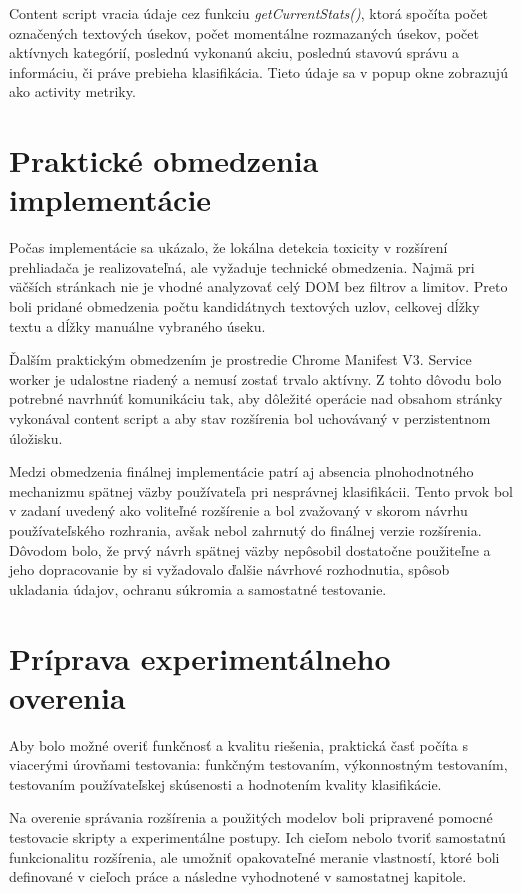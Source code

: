 Content script vracia údaje cez funkciu \emph{getCurrentStats()}, ktorá spočíta počet označených textových úsekov, počet momentálne rozmazaných úsekov, počet aktívnych kategórií, poslednú vykonanú akciu, poslednú stavovú správu a informáciu, či práve prebieha klasifikácia. Tieto údaje sa v popup okne zobrazujú ako activity metriky.

\section{Praktické obmedzenia implementácie}
Počas implementácie sa ukázalo, že lokálna detekcia toxicity v rozšírení prehliadača je realizovateľná, ale vyžaduje technické obmedzenia. Najmä pri väčších stránkach nie je vhodné analyzovať celý DOM bez filtrov a limitov. Preto boli pridané obmedzenia počtu kandidátnych textových uzlov, celkovej dĺžky textu a dĺžky manuálne vybraného úseku.

Ďalším praktickým obmedzením je prostredie Chrome Manifest V3. Service worker je udalostne riadený a nemusí zostať trvalo aktívny. Z tohto dôvodu bolo potrebné navrhnúť komunikáciu tak, aby dôležité operácie nad obsahom stránky vykonával content script a aby stav rozšírenia bol uchovávaný v perzistentnom úložisku.

Medzi obmedzenia finálnej implementácie patrí aj absencia plnohodnotného mechanizmu spätnej väzby používateľa pri nesprávnej klasifikácii. Tento prvok bol v zadaní uvedený ako voliteľné rozšírenie a bol zvažovaný v skorom návrhu používateľského rozhrania, avšak nebol zahrnutý do finálnej verzie rozšírenia. Dôvodom bolo, že prvý návrh spätnej väzby nepôsobil dostatočne použiteľne a jeho dopracovanie by si vyžadovalo ďalšie návrhové rozhodnutia, spôsob ukladania údajov, ochranu súkromia a samostatné testovanie.

\section{Príprava experimentálneho overenia}
Aby bolo možné overiť funkčnosť a kvalitu riešenia, praktická časť počíta s viacerými úrovňami testovania: funkčným testovaním, výkonnostným testovaním, testovaním používateľskej skúsenosti a hodnotením kvality klasifikácie.

Na overenie správania rozšírenia a použitých modelov boli pripravené pomocné testovacie skripty a experimentálne postupy. Ich cieľom nebolo tvoriť samostatnú funkcionalitu rozšírenia, ale umožniť opakovateľné meranie vlastností, ktoré boli definované v cieľoch práce a následne vyhodnotené v samostatnej kapitole.

